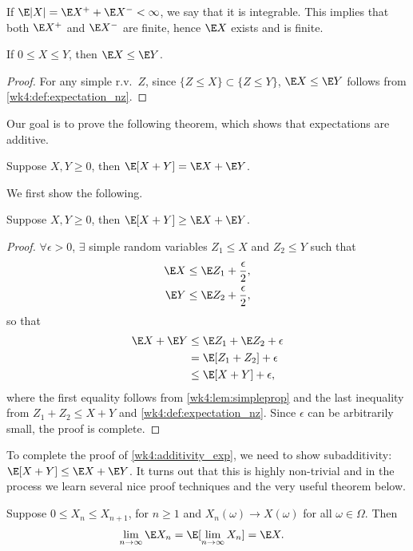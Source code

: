 \documentclass[../aipt.tex]{subfiles}
\begin{document}
If $\E|X| = \E X^+ + \E X^-<\infty$, we say that it is integrable. This implies that both $\E X^+$ and $\E X^-$ are finite, hence $\E X$ exists and is finite.

\begin{Lemma}\label{wk4:lem:XlessY}
If $0\leq X \leq Y$, then $\E X \leq \E Y$.
\end{Lemma}
\begin{proof}
For any simple r.v.\ $Z$, since $\{Z\leq X\} \subset \{Z\leq Y\}$, $\E X \leq \E Y$ follows from \cref{wk4:def:expectation_nz}.
\end{proof}

Our goal is to prove the following theorem, which shows that expectations are additive.

\begin{Theorem}\label{wk4:additivity_exp}
Suppose $X,Y\geq 0$, then $\E[X+Y] = \E X+\E Y$. 
\end{Theorem}

We first show the following.
\begin{Lemma} 
Suppose $X,Y\geq 0$, then $\E[X+Y] \geq \E X+\E Y$.
\end{Lemma}
\begin{proof}
$\forall \epsilon>0$, $\exists$ simple random variables $Z_1\leq X$ and $Z_2 \leq Y$ such that
\begin{align*}
\E X & \leq \E Z_1+\frac{\epsilon}{2},\\
\E Y & \leq \E Z_2+\frac{\epsilon}{2},
\end{align*}
so that
\begin{align*}
\E X+\E Y 
&\leq \E Z_1 + \E Z_2 + \epsilon\\
& = \E[Z_1+Z_2]+\epsilon \\
& \leq \E[X+Y]+\epsilon,
\end{align*}
where the first equality follows from \cref{wk4:lem:simpleprop} and the last inequality from $Z_1+Z_2\leq X+Y$ and \cref{wk4:def:expectation_nz}. Since $\epsilon$ can be arbitrarily small, the proof is complete.
\end{proof}

To complete the proof of \cref{wk4:additivity_exp}, we need to show subadditivity: $\E[X+Y] \leq \E X + \E Y$. It turns out that this is highly non-trivial and in the process we learn several nice proof techniques and the very useful theorem below.

\begin{Theorem}\label{Monotone Convergence Theorem}
Suppose $0 \leq X_n \leq X_{n+1}$, for $n \geq 1$ and $X_n(\omega) \to X(\omega)$ for all $\omega\in\Omega$. Then 
\begin{align*}
\lim_{n\to \infty}\E X_n &= \E[\lim_{n\to \infty}X_n]= \E X.
\end{align*}
\end{Theorem}
\end{document}
